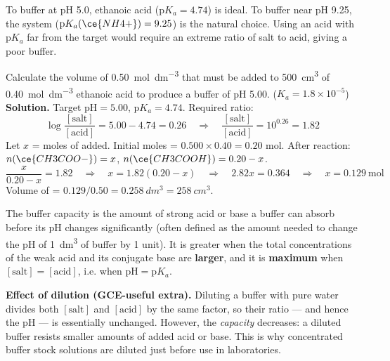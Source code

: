 \documentclass[11pt]{article}
\newcommand{\cle}[1]{{\popxbold\color{popdark}#1}}
\newcounter{popsec}
\newcounter{popsub}
\newcommand{\courssub}[1]{%
  \stepcounter{popsub}%
  \par\vspace{9pt}\noindent{\popxbold\fontsize{11.5}{13}\selectfont\color{popink}{\color{poporange}\thepopsec.\thepopsub}\hspace{6pt}#1}\par\nopagebreak\vspace{4pt}
}
\begin{document}
\begin{exemplebox}
To buffer at pH 5.0, ethanoic acid ($\mathrm{p}K_a = 4.74$) is ideal. To buffer near pH 9.25, the  system ($\mathrm{p}K_a(\ce{NH4+}) = 9.25$) is the natural choice. Using an acid with $\mathrm{p}K_a$ far from the target would require an extreme ratio of salt to acid, giving a poor buffer.
\end{exemplebox}

\begin{exoresolu}
Calculate the volume of \SI{0.50}{mol.dm^{-3}}  that must be added to \SI{500}{cm^3} of \SI{0.40}{mol.dm^{-3}} ethanoic acid to produce a buffer of pH 5.00. ($K_a = 1.8\times10^{-5}$)
\tcblower
\textbf{Solution.} Target $\mathrm{pH} = 5.00$, $\mathrm{p}K_a = 4.74$. Required ratio:
\[ \log\frac{[\text{salt}]}{[\text{acid}]} = 5.00 - 4.74 = 0.26 \quad\Rightarrow\quad \frac{[\text{salt}]}{[\text{acid}]} = 10^{0.26} = 1.82 \]
Let $x$ = moles of  added. Initial moles  = $0.500 \times 0.40 = 0.20$ mol.
After reaction: $n(\ce{CH3COO-}) = x$, $n(\ce{CH3COOH}) = 0.20 - x$.
\[ \frac{x}{0.20 - x} = 1.82 \quad\Rightarrow\quad x = 1.82(0.20 - x) \quad\Rightarrow\quad 2.82x = 0.364 \quad\Rightarrow\quad x = 0.129\ \mathrm{mol} \]
Volume of  = $0.129 / 0.50 = \SI{0.258}{dm^3} = \SI{258}{cm^3}$.
\end{exoresolu}

\courssub{Buffer Capacity and Dilution}

\begin{definition}
The \cle{buffer capacity} is the amount of strong acid or base a buffer can absorb before its pH changes significantly (often defined as the amount needed to change the pH of \SI{1}{dm^3} of buffer by 1 unit). It is greater when the total concentrations of the weak acid and its conjugate base are \textbf{larger}, and it is \textbf{maximum} when $[\text{salt}] = [\text{acid}]$, i.e. when $\mathrm{pH} = \mathrm{p}K_a$.
\end{definition}

\textbf{Effect of dilution (GCE-useful extra).} Diluting a buffer with pure water divides both $[\text{salt}]$ and $[\text{acid}]$ by the same factor, so their ratio — and hence the pH — is essentially unchanged. However, the \emph{capacity} decreases: a diluted buffer resists smaller amounts of added acid or base. This is why concentrated buffer stock solutions are diluted just before use in laboratories.
\end{document}
